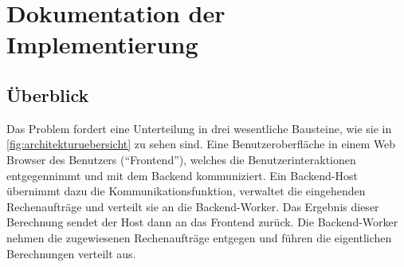 \section{Dokumentation der Implementierung}







\subsection{Überblick}

Das Problem fordert eine Unterteilung in drei wesentliche Bausteine, wie sie in \autoref{fig:architekturuebersicht} zu sehen sind.
Eine Benutzeroberfläche in einem Web Browser des Benutzers (“Frontend”), welches die Benutzerinteraktionen entgegennimmt und mit dem Backend kommuniziert.
Ein Backend-Host übernimmt dazu die Kommunikationsfunktion, verwaltet die eingehenden Rechenaufträge und verteilt sie an die Backend-Worker. Das Ergebnis dieser Berechnung sendet der Host dann an das Frontend zurück.
Die Backend-Worker nehmen die zugewiesenen Rechenaufträge entgegen und führen die eigentlichen Berechnungen verteilt aus.

